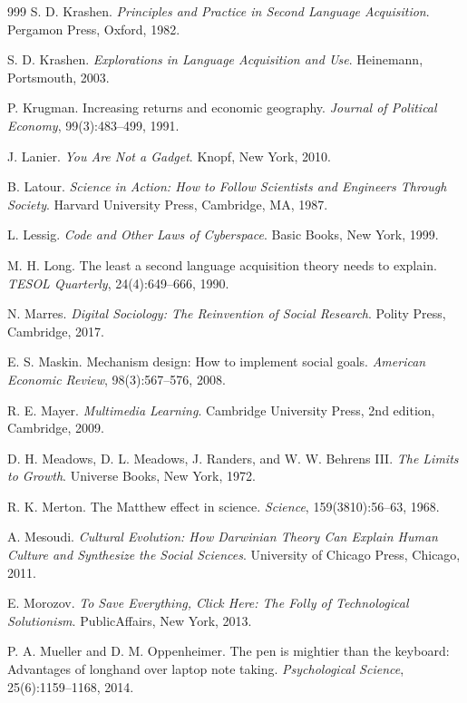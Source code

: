 \documentclass[11pt]{article}
\begin{document}
\begin{thebibliography}{999}
S. D. Krashen.
\textit{Principles and Practice in Second Language Acquisition}.
Pergamon Press, Oxford, 1982.

S. D. Krashen.
\textit{Explorations in Language Acquisition and Use}.
Heinemann, Portsmouth, 2003.

P. Krugman.
Increasing returns and economic geography.
\textit{Journal of Political Economy}, 99(3):483--499, 1991.

J. Lanier.
\textit{You Are Not a Gadget}.
Knopf, New York, 2010.

B. Latour.
\textit{Science in Action: How to Follow Scientists and Engineers Through Society}.
Harvard University Press, Cambridge, MA, 1987.

L. Lessig.
\textit{Code and Other Laws of Cyberspace}.
Basic Books, New York, 1999.

M. H. Long.
The least a second language acquisition theory needs to explain.
\textit{TESOL Quarterly}, 24(4):649--666, 1990.

N. Marres.
\textit{Digital Sociology: The Reinvention of Social Research}.
Polity Press, Cambridge, 2017.

E. S. Maskin.
Mechanism design: How to implement social goals.
\textit{American Economic Review}, 98(3):567--576, 2008.

R. E. Mayer.
\textit{Multimedia Learning}.
Cambridge University Press, 2nd edition, Cambridge, 2009.

D. H. Meadows, D. L. Meadows, J. Randers, and W. W. Behrens III.
\textit{The Limits to Growth}.
Universe Books, New York, 1972.

R. K. Merton.
The Matthew effect in science.
\textit{Science}, 159(3810):56--63, 1968.

A. Mesoudi.
\textit{Cultural Evolution: How Darwinian Theory Can Explain Human Culture and Synthesize the Social Sciences}.
University of Chicago Press, Chicago, 2011.

E. Morozov.
\textit{To Save Everything, Click Here: The Folly of Technological Solutionism}.
PublicAffairs, New York, 2013.

P. A. Mueller and D. M. Oppenheimer.
The pen is mightier than the keyboard: Advantages of longhand over laptop note taking.
\textit{Psychological Science}, 25(6):1159--1168, 2014.


\end{thebibliography}
\end{document}
